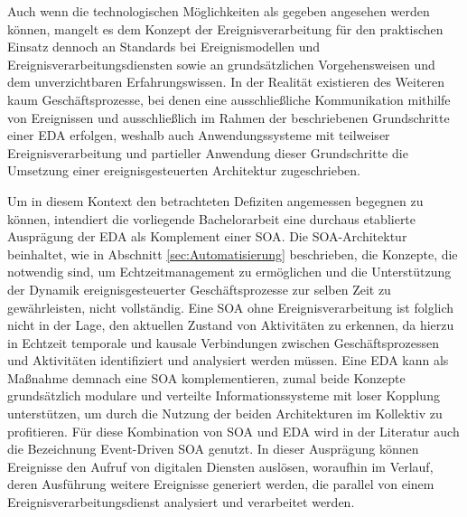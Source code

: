 Auch wenn die technologischen Möglichkeiten als gegeben angesehen werden können, mangelt es dem Konzept der Ereignisverarbeitung für den praktischen Einsatz dennoch an Standards bei Ereignismodellen und Ereignisverarbeitungsdiensten sowie an grundsätzlichen Vorgehensweisen und dem unverzichtbaren Erfahrungswissen. 
\cite{Etzion.2011}
In der Realität existieren des Weiteren kaum Geschäftsprozesse, bei denen eine ausschließliche Kommunikation mithilfe von Ereignissen und ausschließlich im Rahmen der beschriebenen Grundschritte einer \ac{EDA} erfolgen, weshalb auch Anwendungssysteme mit teilweiser Ereignisverarbeitung und partieller Anwendung dieser Grundschritte die Umsetzung einer ereignisgesteuerten Architektur zugeschrieben.
\cite{Etzion.2011}


Um in diesem Kontext den betrachteten Defiziten angemessen begegnen zu können, intendiert die vorliegende Bachelorarbeit eine durchaus etablierte Ausprägung der \ac{EDA} als Komplement einer \ac{SOA}.
Die \ac{SOA}-Architektur beinhaltet, wie in Abschnitt \ref{sec:Automatisierung} beschrieben, die Konzepte, die notwendig sind, um Echtzeitmanagement zu ermöglichen und die Unterstützung der Dynamik ereignisgesteuerter Geschäftsprozesse zur selben Zeit zu gewährleisten, nicht vollständig.
Eine \ac{SOA} ohne Ereignisverarbeitung ist folglich nicht in der Lage, den aktuellen Zustand von Aktivitäten zu erkennen, da hierzu in Echtzeit temporale und kausale Verbindungen zwischen Geschäftsprozessen und Aktivitäten identifiziert und analysiert werden müssen. 
Eine \ac{EDA} kann als Maßnahme demnach eine \ac{SOA} komplementieren, zumal beide Konzepte grundsätzlich modulare und verteilte Informationssysteme mit loser Kopplung unterstützen, um durch die Nutzung der beiden Architekturen im Kollektiv zu profitieren. 
Für diese Kombination von \ac{SOA} und \ac{EDA} wird in der Literatur auch die Bezeichnung Event-Driven SOA genutzt.
\cite{Bruns.2010}
In dieser Ausprägung können Ereignisse den Aufruf von digitalen Diensten auslösen, woraufhin im Verlauf, deren Ausführung weitere Ereignisse generiert werden, die parallel von einem Ereignisverarbeitungsdienst analysiert und verarbeitet werden. 
\cite{Bruns.2010}
